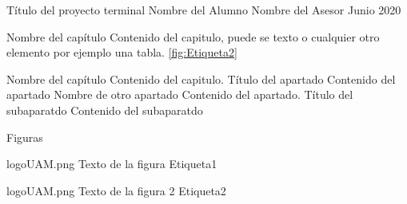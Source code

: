 \documentclass{./class/pt}
\begin{document}
    \portadaTSI
        {Título del proyecto terminal}
        {Nombre del Alumno}
        {Nombre del Asesor}
        {Junio 2020}


    \capituloPt
        {Nombre del capítulo}
        {
            Contenido del capitulo, puede se texto o cualquier otro elemento
            por ejemplo una tabla. \ref{fig:Etiqueta2}
        }

    \capituloPt
        {Nombre del capítulo}
        {
            Contenido del capitulo.
            \apartado
                {Título del apartado}
                {Contenido del apartado}
            \apartado
                {Nombre de otro apartado}
                {
                    Contenido del apartado.
                    \subapartado
                        {Título del subaparatdo}
                        {Contenido del subaparatdo}
                }
        }

        \capituloPt
            {Figuras}
            {
                \imagenSimple
                    {logoUAM.png}
                    {Texto de la figura}
                    {Etiqueta1}

                \imagenSimple
                    {logoUAM.png}
                    {Texto de la figura 2}
                    {Etiqueta2}
                    
            }
\end{document}
